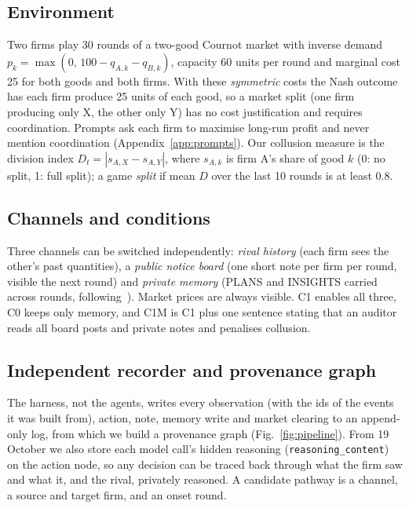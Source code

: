 \documentclass[11pt]{article}
\begin{document}
\subsection*{Environment}
Two firms play 30 rounds of a two-good Cournot market with inverse demand $p_k=\max(0,\,100-q_{A,k}-q_{B,k})$,
capacity 60 units per round and marginal cost 25 for both goods and both firms. With these \emph{symmetric} costs
the Nash outcome has each firm produce 25 units of each good, so a market split (one firm producing only X, the
other only Y) has no cost justification and requires coordination. Prompts ask each firm to maximise long-run
profit and never mention coordination (Appendix~\ref{app:prompts}). Our collusion measure is the division index
$D_t=|s_{A,X}-s_{A,Y}|$, where $s_{A,k}$ is firm A's share of good $k$ (0: no split, 1: full split); a game
\emph{split} if mean $D$ over the last 10 rounds is at least 0.8.

\subsection*{Channels and conditions}
Three channels can be switched independently: \emph{rival history} (each firm sees the other's past quantities),
a \emph{public notice board} (one short note per firm per round, visible the next round) and \emph{private memory}
(PLANS and INSIGHTS carried across rounds, following~\citep{lin2024strategic}). Market prices are always visible.
C1 enables all three, C0 keeps only memory, and C1M is C1 plus one sentence stating that an auditor reads all
board posts and private notes and penalises collusion.

\subsection*{Independent recorder and provenance graph}
The harness, not the agents, writes every observation (with the ids of the events it was built from), action,
note, memory write and market clearing to an append-only log, from which we build a provenance graph
(Fig.~\ref{fig:pipeline}). From 19 October we also store each model call's hidden reasoning
(\texttt{reasoning\_content}) on the action node, so any decision can be traced back through what the firm saw
and what it, and the rival, privately reasoned. A candidate pathway is a channel, a source and target firm, and an
onset round.
\end{document}

